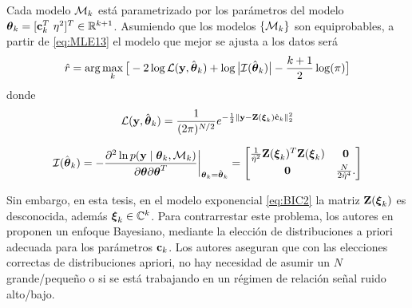 Cada modelo $\mathcal{M}_k$ está parametrizado por los parámetros del modelo $\vectheta_k = [\c_k^T\ \eta^2]^T\in\R^{k+1}$. Asumiendo que los modelos $\{\mathcal{M}_k\}$ son equiprobables, a partir de \eqref{eq:MLE13} el modelo que mejor se ajusta a los datos será
\begin{equation}
	\hat{r} = \arg\max_{k} \big[-2\log\mathcal{L}(\mathbf{y},\hat{\boldsymbol{\theta}}_k) + \log\big|\mathcal{I}(\hat{\boldsymbol{\theta}}_k)\big| - \frac{k+1}{2}\log(\pi)\big]
\end{equation}
donde  
\begin{equation}
	\mathcal{L}(\mathbf{y},\hat{\boldsymbol{\theta}}_k) = \frac{1}{(2\pi)^{N/2}}e^{-\frac{1}{2}\|\mathbf{y}-\mathbf{Z}(\boldsymbol{\xi}_k)\hat{\mathbf{c}}_k\|_2^2}
\end{equation}

\begin{equation}
	\mathcal{I}(\hat{\boldsymbol{\theta}}_k) = -\frac{\partial^2\ln p(\mathbf{y}\mid \boldsymbol{\theta}_k,\mathcal{M}_k)}{\partial\boldsymbol{\theta}\partial\boldsymbol{\theta}^T}\bigg|_{\boldsymbol{\theta}_k=\hat{\boldsymbol{\theta}}_k} = \begin{bmatrix} \frac{1}{\hat{\eta}^2}\mathbf{Z}(\boldsymbol{\xi}_k)^T\mathbf{Z}(\boldsymbol{\xi}_k) & \mathbf{0}\\[0.3em] \mathbf{0} & \frac{N}{2\hat{\eta}^4}.
	\end{bmatrix}
	\label{Eq:Bic7}
\end{equation}

Sin embargo, en esta tesis, en el modelo exponencial \eqref{eq:BIC2} la matriz $\mathbf{Z}(\boldsymbol{\xi}_k)$ es desconocida, además $\boldsymbol{\xi}_k\in\mathbb{C}^k$. Para contrarrestar este problema, los autores en \cite{Nielsen2013} proponen un enfoque Bayesiano, mediante la elección de distribuciones a priori adecuada para los parámetros $\mathbf{c}_k$.  Los autores aseguran que con las elecciones correctas de distribuciones apriori, no hay necesidad de asumir un $N$ grande/pequeño o si se está trabajando en un régimen de relación señal ruido alto/bajo. 

